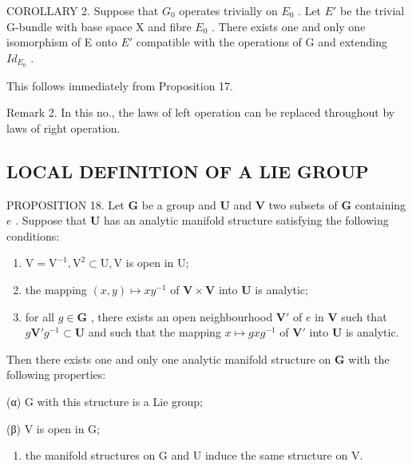 COROLLARY 2. Suppose that \(G_{0}\) operates trivially on \(E_{0}\) . Let \(E'\) be the trivial G-bundle with base space X and fibre \(E_{0}\) . There exists one and only one isomorphism of E onto \(E'\) compatible with the operations of G and extending \(Id_{E_{0}}\) .

This follows immediately from Proposition 17.

Remark 2. In this no., the laws of left operation can be replaced throughout by laws of right operation.

\subsection{LOCAL DEFINITION OF A LIE GROUP}

PROPOSITION 18. Let \(\mathbf{G}\) be a group and \(\mathbf{U}\) and \(\mathbf{V}\) two subsets of \(\mathbf{G}\) containing \(e\) . Suppose that \(\mathbf{U}\) has an analytic manifold structure satisfying the following conditions:

\begin{enumerate}
\def\labelenumi{(\roman{enumi})}
\item
  \(\mathrm{V} = \mathrm{V}^{-1},\mathrm{V}^2\subset \mathrm{U},\mathrm{V}\) is open in U;
\item
  the mapping \((x,y)\mapsto xy^{-1}\) of \(\mathbf{V}\times \mathbf{V}\) into \(\mathbf{U}\) is analytic;
\item
  for all \(g \in \mathbf{G}\) , there exists an open neighbourhood \(\mathbf{V}'\) of \(e\) in \(\mathbf{V}\) such that \(g\mathbf{V}'g^{-1} \subset \mathbf{U}\) and such that the mapping \(x \mapsto gxg^{-1}\) of \(\mathbf{V}'\) into \(\mathbf{U}\) is analytic.
\end{enumerate}

Then there exists one and only one analytic manifold structure on \(\mathbf{G}\) with the following properties:

(α) G with this structure is a Lie group;

(β) V is open in G;

\begin{enumerate}
\def\labelenumi{(\Alph{enumi})}
\setcounter{enumi}{24}
\tightlist
\item
  the manifold structures on G and U induce the same structure on V.
\end{enumerate}

